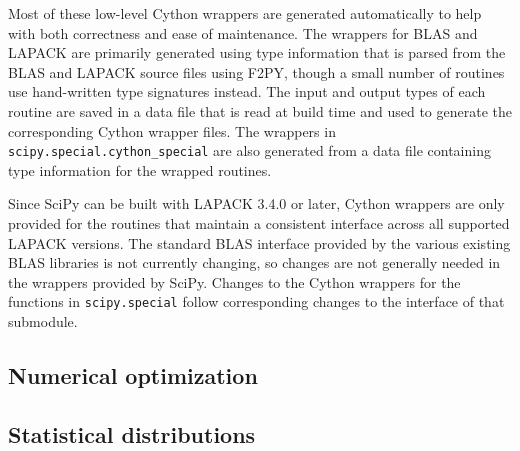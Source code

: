 \documentclass[fleqn,10pt]{wlscirep}
\begin{document}
Most of these low-level Cython wrappers are generated automatically to help
with both correctness and ease of maintenance.  The wrappers for BLAS and
LAPACK are primarily generated using type information that is parsed from the
BLAS and LAPACK source files using F2PY\cite{peterson2009f2py}, though a small
number of routines use hand-written type signatures instead.  The input and
output types of each routine are saved in a data file that is read at build
time and used to generate the corresponding Cython wrapper files.  The wrappers
in \texttt{scipy.{\allowbreak}special.{\allowbreak}cython\_special} are also
generated from a data file containing type information for the wrapped
routines.

Since SciPy can be built with LAPACK 3.4.0 or later, Cython wrappers are only
provided for the routines that maintain a consistent interface across all
supported LAPACK versions.  The standard BLAS interface provided by the various
existing BLAS libraries is not currently changing, so changes are not generally
needed in the wrappers provided by SciPy.  Changes to the Cython wrappers for
the functions in \texttt{scipy.{\allowbreak}special} follow corresponding
changes to the interface of that submodule.

\subsection*{Numerical optimization}



\subsection*{Statistical distributions}
\end{document}
